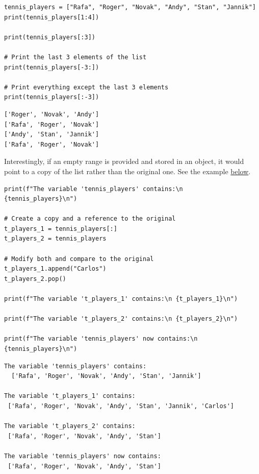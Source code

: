 \documentclass[10pt]{book}
\begin{document}
\label{orgfcc1a8c}
\begin{verbatim}
tennis_players = ["Rafa", "Roger", "Novak", "Andy", "Stan", "Jannik"]
print(tennis_players[1:4])

print(tennis_players[:3])

# Print the last 3 elements of the list
print(tennis_players[-3:])

# Print everything except the last 3 elements
print(tennis_players[:-3])
\end{verbatim}

\label{org7a2503c}
\begin{verbatim}
['Roger', 'Novak', 'Andy']
['Rafa', 'Roger', 'Novak']
['Andy', 'Stan', 'Jannik']
['Rafa', 'Roger', 'Novak']
\end{verbatim}

Interestingly, if an empty range is provided and stored in an object, it would point to a copy of the list rather than the original one. See the example \hyperref[orgd1a69cb]{below}.

\label{orgd1a69cb}
\begin{verbatim}
print(f"The variable 'tennis_players' contains:\n  {tennis_players}\n")

# Create a copy and a reference to the original
t_players_1 = tennis_players[:]
t_players_2 = tennis_players

# Modify both and compare to the original
t_players_1.append("Carlos")
t_players_2.pop()

print(f"The variable 't_players_1' contains:\n {t_players_1}\n")

print(f"The variable 't_players_2' contains:\n {t_players_2}\n")

print(f"The variable 'tennis_players' now contains:\n {tennis_players}\n")
\end{verbatim}

\label{org2b4b3bd}
\begin{verbatim}
The variable 'tennis_players' contains:
  ['Rafa', 'Roger', 'Novak', 'Andy', 'Stan', 'Jannik']

The variable 't_players_1' contains:
 ['Rafa', 'Roger', 'Novak', 'Andy', 'Stan', 'Jannik', 'Carlos']

The variable 't_players_2' contains:
 ['Rafa', 'Roger', 'Novak', 'Andy', 'Stan']

The variable 'tennis_players' now contains:
 ['Rafa', 'Roger', 'Novak', 'Andy', 'Stan']
\end{verbatim}
\end{document}
